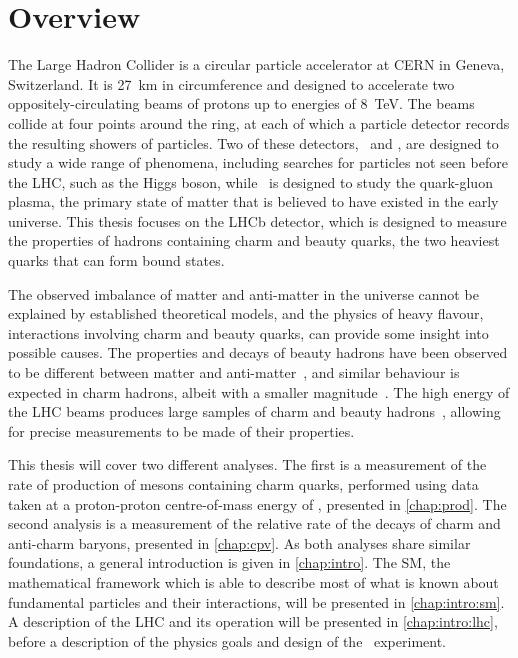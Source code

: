 \chapter{Overview}
\label{chap:intro:overview}

The Large Hadron Collider is a circular particle accelerator at CERN in Geneva, 
Switzerland.
It is \SI{27}{\kilo\metre} in circumference and designed to accelerate two 
oppositely-circulating beams of protons up to energies of \SI{8}{\TeV}.
The beams collide at four points around the ring, at each of which a particle 
detector records the resulting showers of particles.
Two of these detectors, \atlas\ and \cms, are designed to study a wide range of 
phenomena, including searches for particles not seen before the \ac{LHC}, such 
as the Higgs boson, while \alice\ is designed to study the quark-gluon plasma, 
the primary state of matter that is believed to have existed in the early 
universe.
This thesis focuses on the LHCb detector, which is designed to measure the 
properties of hadrons containing charm and beauty quarks, the two heaviest 
quarks that can form bound states.

The observed imbalance of matter and anti-matter in the universe cannot be 
explained by established theoretical models, and the physics of heavy flavour, 
interactions involving charm and beauty quarks, can provide some insight into 
possible causes.
The properties and decays of beauty hadrons have been observed to be different 
between matter and 
anti-matter~\cite{Aubert:2001nu,Abe:2001xe,Aaij:2012kz,Aaij:2013iua,Aaij:2016cla}, 
and similar behaviour is expected in charm hadrons, albeit with a smaller 
magnitude~\cite{Grossman:2006jg}.
The high energy of the \ac{LHC} beams produces large samples of charm and 
beauty hadrons~\cite{LHCb-PAPER-2012-041,LHCb-PAPER-2013-004}, allowing for 
precise measurements to be made of their properties.

This thesis will cover two different analyses.
The first is a measurement of the rate of production of mesons containing charm 
quarks, performed using data taken at a proton-proton centre-of-mass energy of 
\runtwocom, presented in \cref{chap:prod}.
The second analysis is a measurement of the relative rate of the decays of 
charm and anti-charm baryons, presented in \cref{chap:cpv}.
As both analyses share similar foundations, a general introduction is given in 
\cref{chap:intro}.
The \acl{SM}, the mathematical framework which is able to describe most of what 
is known about fundamental particles and their interactions, will be presented 
in \cref{chap:intro:sm}.
A description of the \acl{LHC} and its operation will be presented in 
\cref{chap:intro:lhc}, before a description of the physics goals and design of 
the \lhcb\ experiment.
